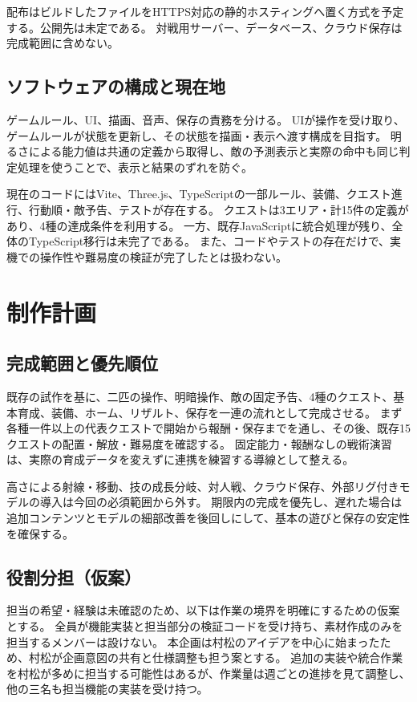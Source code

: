\documentclass[a4paper,11pt,dvipdfmx]{jsarticle}
\begin{document}
配布はビルドしたファイルをHTTPS対応の静的ホスティングへ置く方式を予定する。公開先は未定である。
対戦用サーバー、データベース、クラウド保存は完成範囲に含めない。

\subsection{ソフトウェアの構成と現在地}
ゲームルール、UI、描画、音声、保存の責務を分ける。
UIが操作を受け取り、ゲームルールが状態を更新し、その状態を描画・表示へ渡す構成を目指す。
明るさによる能力値は共通の定義から取得し、敵の予測表示と実際の命中も同じ判定処理を使うことで、表示と結果のずれを防ぐ。

現在のコードにはVite、Three.js、TypeScriptの一部ルール、装備、クエスト進行、行動順・敵予告、テストが存在する。
クエストは3エリア・計15件の定義があり、4種の達成条件を利用する。
一方、既存JavaScriptに統合処理が残り、全体のTypeScript移行は未完了である。
また、コードやテストの存在だけで、実機での操作性や難易度の検証が完了したとは扱わない。

\section{制作計画}
\subsection{完成範囲と優先順位}
既存の試作を基に、二匹の操作、明暗操作、敵の固定予告、4種のクエスト、基本育成、装備、ホーム、リザルト、保存を一連の流れとして完成させる。
まず各種一件以上の代表クエストで開始から報酬・保存までを通し、その後、既存15クエストの配置・解放・難易度を確認する。
固定能力・報酬なしの戦術演習は、実際の育成データを変えずに連携を練習する導線として整える。

高さによる射線・移動、技の成長分岐、対人戦、クラウド保存、外部リグ付きモデルの導入は今回の必須範囲から外す。
期限内の完成を優先し、遅れた場合は追加コンテンツとモデルの細部改善を後回しにして、基本の遊びと保存の安定性を確保する。

\subsection{役割分担（仮案）}
担当の希望・経験は未確認のため、以下は作業の境界を明確にするための仮案とする。
全員が機能実装と担当部分の検証コードを受け持ち、素材作成のみを担当するメンバーは設けない。
本企画は村松のアイデアを中心に始まったため、村松が企画意図の共有と仕様調整も担う案とする。
追加の実装や統合作業を村松が多めに担当する可能性はあるが、作業量は週ごとの進捗を見て調整し、他の三名も担当機能の実装を受け持つ。
\end{document}
